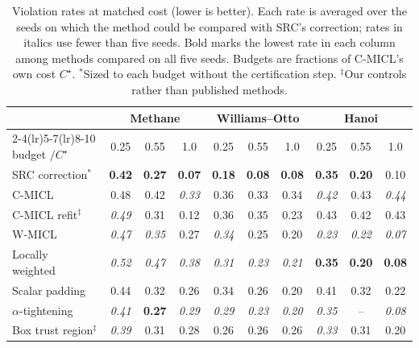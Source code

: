 \begin{table}[t]
\centering
\footnotesize
\setlength{\tabcolsep}{3pt}
\caption{Violation rates at matched cost (lower is better). Each rate is averaged
over the seeds on which the method could be compared with SRC's correction; rates in
italics use fewer than five seeds. Bold marks the lowest rate in each column among
methods compared on all five seeds. Budgets are fractions of C-MICL's own cost
$C^{\star}$. $^{\ast}$Sized to each budget without the certification step.
$^{\ddagger}$Our controls rather than published methods.}
\label{tab:matched}
\begin{tabular}{l ccc ccc ccc}
\toprule
 & \multicolumn{3}{c}{Methane} & \multicolumn{3}{c}{Williams--Otto} & \multicolumn{3}{c}{Hanoi} \\
\cmidrule(lr){2-4}\cmidrule(lr){5-7}\cmidrule(lr){8-10}
budget $/C^{\star}$ & 0.25 & 0.55 & 1.0 & 0.25 & 0.55 & 1.0 & 0.25 & 0.55 & 1.0 \\
\midrule
SRC correction$^{\ast}$ & \textbf{0.42} & \textbf{0.27} & \textbf{0.07} & \textbf{0.18} & \textbf{0.08} & \textbf{0.08} & \textbf{0.35} & \textbf{0.20} & 0.10 \\
\midrule
C-MICL~\cite{bib12} & 0.48 & 0.42 & \textit{0.33} & 0.36 & 0.33 & 0.34 & \textit{0.42} & 0.43 & \textit{0.44} \\
C-MICL refit$^{\ddagger}$ & \textit{0.49} & 0.31 & 0.12 & 0.36 & 0.35 & 0.23 & 0.43 & 0.42 & 0.43 \\
W-MICL~\cite{bib12} & \textit{0.47} & \textit{0.35} & 0.27 & \textit{0.34} & 0.25 & 0.20 & \textit{0.23} & \textit{0.22} & \textit{0.07} \\
Locally weighted~\cite{bib31} & \textit{0.52} & \textit{0.47} & \textit{0.38} & \textit{0.31} & \textit{0.23} & \textit{0.21} & \textbf{0.35} & \textbf{0.20} & \textbf{0.08} \\
Scalar padding & 0.44 & 0.32 & 0.26 & 0.34 & 0.26 & 0.20 & 0.41 & 0.32 & 0.22 \\
$\alpha$-tightening & \textit{0.41} & \textbf{0.27} & \textit{0.29} & \textit{0.29} & \textit{0.23} & \textit{0.20} & \textit{0.35} & -- & \textit{0.08} \\
Box trust region$^{\ddagger}$ & \textit{0.39} & 0.31 & 0.28 & 0.26 & 0.26 & 0.26 & \textit{0.33} & 0.31 & 0.20 \\
\bottomrule
\end{tabular}
\end{table}
